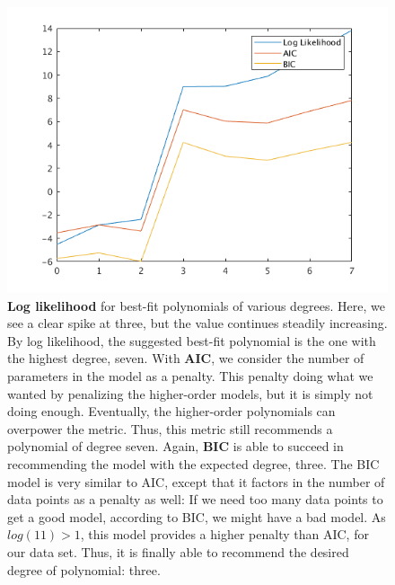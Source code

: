 \documentclass{article}
\begin{document}
\begin{figure}[!ht]
	\centering
	\includegraphics[width=120mm]{q5-eval-metrics.png}
	\caption{\textbf{Log likelihood} for best-fit polynomials of various degrees. Here, 
        we see a clear spike at three, but the value continues steadily 
        increasing. By log likelihood, the suggested best-fit polynomial is the 
        one with the highest degree, seven.
        With \textbf{AIC}, we consider the number of parameters in the model as a 
        penalty. This penalty doing what we wanted by penalizing the 
        higher-order models, but it is simply not doing enough. Eventually, the 
        higher-order polynomials can overpower the metric. Thus, this metric 
        still recommends a polynomial of degree seven.
        Again, \textbf{BIC} is able to succeed in recommending the model with the 
        expected degree, three. The BIC model is very similar to AIC, except 
        that it factors in the number of data points as a penalty as well: If 
        we need too many data points to get a good model, according to BIC, we 
        might have a bad model. As $log(11) > 1$, this model provides a higher 
        penalty than AIC, for our data set. Thus, it is finally able to 
        recommend the desired degree of polynomial: three.}
\end{figure}

~\\
~\\
~\\
~\\
~\\
~\\
~\\
~\\
~\\
~\\
~\\
~\\
~\\
~\\
~\\
~\\
\end{document}
